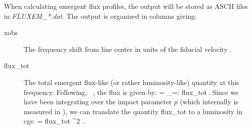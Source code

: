 \documentclass[10pt,a4paper]{article}
\begin{document}
When calculating emergent flux profiles, the output will be stored as ASCII files in \textit{FLUXEM\_*.dat}.
The output is organized in columns giving:
\begin{description}
\item[xobs] The frequency shift from line center in units of the fiducial velocity \vthfid.
\item[flux\_tot] The total emergent flux-like (or rather
  luminosity-like) quantity at this frequency. Following,
  \eg~\citet[Sect. 3.7]{Hennicker2020}, the flux is given by:
  \beq
  \Fnu =  _{=: \textrm{flux\_tot}}\,.
  \eeq
  Since we have been integrating over the impact parameter $p$ (which internally is measured in \Rstar), we can translate the quantity flux\_tot to a luminosity in cgs:
  \beq
  \Lnu = \textrm{flux\_tot} \cdot \Rstar^2  \pi\,.
  \eeq

\end{description}
\end{document}
